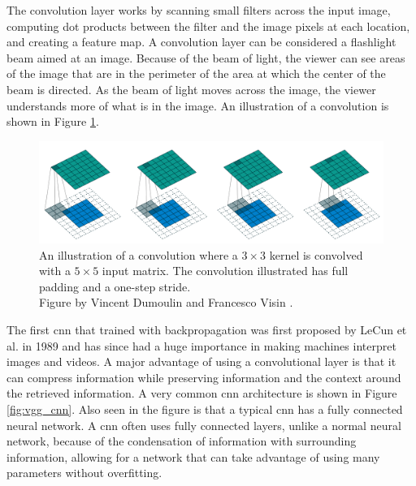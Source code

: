     The convolution layer works by scanning small filters across the input image, computing dot products between the filter and the image pixels at each location, and creating a feature map. A convolution layer can be considered a flashlight beam aimed at an image. Because of the beam of light, the viewer can see areas of the image that are in the perimeter of the area at which the center of the beam is directed. As the beam of light moves across the image, the viewer understands more of what is in the image. An illustration of a convolution is shown in Figure \ref{fig:convolutuon}.

    \begin{figure}[htb]
        \centering
        \includegraphics[width=\linewidth]{images/convolution.png}
        \caption[Illustration of a convolution.]{An illustration of a convolution where a $3 \times 3$ kernel is convolved with a $5 \times 5$ input matrix. The convolution illustrated has full padding and a one-step stride.\\
        Figure by Vincent Dumoulin and Francesco Visin \cite{dumoulinGuideConvolutionArithmetic2018}.}
        \label{fig:convolutuon}
    \end{figure}


    The first \gls{cnn} that trained with backpropagation was first proposed by LeCun et al. in 1989 \cite{lecunHandwrittenDigitRecognition1989} and has since had a huge importance in making machines interpret images and videos. A major advantage of using a convolutional layer is that it can compress information while preserving information and the context around the retrieved information. A very common \gls{cnn} architecture is shown in Figure \ref{fig:vgg_cnn}. Also seen in the figure is that a typical \gls{cnn} has a fully connected neural network. A \gls{cnn} often uses fully connected layers, unlike a normal neural network, because of the condensation of information with surrounding information, allowing for a network that can take advantage of using many parameters without overfitting.  

